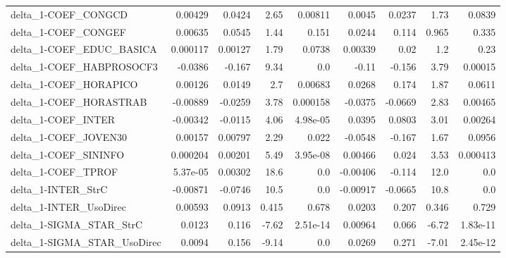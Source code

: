 \begin{tabular}{lrrrrrrrr}
delta\_1-COEF\_CONGCD                  &     0.00429 &       0.0424 &    2.65 &  0.00811 &     0.0045 &      0.0237 &         1.73 &        0.0839 \\
delta\_1-COEF\_CONGEF                  &     0.00635 &       0.0545 &    1.44 &    0.151 &     0.0244 &       0.114 &        0.965 &         0.335 \\
delta\_1-COEF\_EDUC\_BASICA             &    0.000117 &      0.00127 &    1.79 &   0.0738 &    0.00339 &        0.02 &          1.2 &          0.23 \\
delta\_1-COEF\_HABPROSOCF3             &     -0.0386 &       -0.167 &    9.34 &      0.0 &      -0.11 &      -0.156 &         3.79 &       0.00015 \\
delta\_1-COEF\_HORAPICO                &     0.00126 &       0.0149 &     2.7 &  0.00683 &     0.0268 &       0.174 &         1.87 &        0.0611 \\
delta\_1-COEF\_HORASTRAB               &    -0.00889 &      -0.0259 &    3.78 & 0.000158 &    -0.0375 &     -0.0669 &         2.83 &       0.00465 \\
delta\_1-COEF\_INTER                   &    -0.00342 &      -0.0115 &    4.06 & 4.98e-05 &     0.0395 &      0.0803 &         3.01 &       0.00264 \\
delta\_1-COEF\_JOVEN30                 &     0.00157 &      0.00797 &    2.29 &    0.022 &    -0.0548 &      -0.167 &         1.67 &        0.0956 \\
delta\_1-COEF\_SININFO                 &    0.000204 &      0.00201 &    5.49 & 3.95e-08 &    0.00466 &       0.024 &         3.53 &      0.000413 \\
delta\_1-COEF\_TPROF                   &    5.37e-05 &      0.00302 &    18.6 &      0.0 &   -0.00406 &      -0.114 &         12.0 &           0.0 \\
delta\_1-INTER\_StrC                   &    -0.00871 &      -0.0746 &    10.5 &      0.0 &   -0.00917 &     -0.0665 &         10.8 &           0.0 \\
delta\_1-INTER\_UsoDirec               &     0.00593 &       0.0913 &   0.415 &    0.678 &     0.0203 &       0.207 &        0.346 &         0.729 \\
delta\_1-SIGMA\_STAR\_StrC              &      0.0123 &        0.116 &   -7.62 & 2.51e-14 &    0.00964 &       0.066 &        -6.72 &      1.83e-11 \\
delta\_1-SIGMA\_STAR\_UsoDirec          &      0.0094 &        0.156 &   -9.14 &      0.0 &     0.0269 &       0.271 &        -7.01 &      2.45e-12 \\

\end{tabular}

